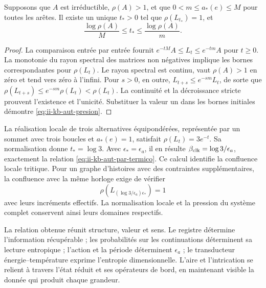\begin{proposition}
Supposons que \(A\) est irréductible, \(\rho(A)>1\), et que
\(0<m\leq a_*(e)\leq M\) pour toutes les arêtes. Il existe un unique
\(t_*>0\) tel que \(\rho(L_{t_*})=1\), et
\begin{equation}
 \frac{\log\rho(A)}{M}\leq t_*\leq
 \frac{\log\rho(A)}{m}.
 \label{eq:ii-kb-aut-presion}
\end{equation}
\end{proposition}
\begin{proof}
La comparaison entrée par entrée fournit \(e^{-tM}A\leq L_t\leq e^{-tm}A\) pour \(t\geq0\). La monotonie du rayon spectral des matrices non négatives implique les bornes correspondantes pour \(\rho(L_t)\). Le rayon spectral est continu, vaut \(\rho(A)>1\) en zéro et tend vers zéro à l'infini. Pour \(s>0\), en outre, \(L_{t+s}\leq e^{-sm}L_t\), de sorte que \(\rho(L_{t+s})\leq e^{-sm}\rho(L_t)<\rho(L_t)\). La continuité et la décroissance stricte prouvent l'existence et l'unicité. Substituer la valeur un dans les bornes initiales démontre \eqref{eq:ii-kb-aut-presion}.
\end{proof}

La réalisation locale de trois alternatives équipondérées, représentée
par un sommet avec trois boucles et \(a_*(e)=1\), satisfait
\(\rho(L_t)=3e^{-t}\). Sa normalisation donne \(t_*=\log3\).
Avec \(\epsilon_*=\epsilon_a\), il en résulte
\(\beta_{\rm clk}=\log3/\epsilon_a\), exactement la relation
\eqref{eq:ii-kb-aut-par-termico}. Ce calcul identifie la
confluence locale tritique. Pour un graphe d'histoires avec des contraintes
supplémentaires, la confluence avec la même horloge exige de vérifier
\[
 \rho\!\left(L_{(\log3/\epsilon_a)\epsilon_*}\right)=1
\]
avec leurs incréments effectifs. La normalisation locale et la pression
du système complet conservent ainsi leurs domaines respectifs.

La relation obtenue réunit structure, valeur et sens. Le registre
détermine l’information récupérable ; les probabilités sur les
continuations déterminent sa lecture entropique ; l’action et la période
déterminent \(\epsilon_a\) ; le transducteur énergie--température
exprime l’entropie dimensionnelle. L’aire et l’intrication se
relient à travers l’état réduit et ses opérateurs de bord,
en maintenant visible la donnée qui produit chaque grandeur.
